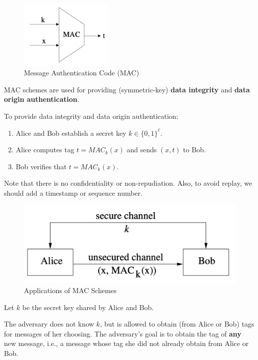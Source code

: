 \documentclass[12pt,titlepage]{article}
\begin{document}
\begin{center}
	\begin{figure}[h!]
		\centering
		\includegraphics[width=0.4\textwidth]{MAC.png}
		\caption{Message Authentication Code (MAC)}
	\end{figure}
\end{center}

MAC schemes are used for providing (symmetric-key) \textbf{data integrity} and \textbf{data origin authentication}.

To provide data integrity and data origin authentication:\begin{enumerate}
\item Alice and Bob establish a secret key $k \in \{0,1\}^\ell$.
\item Alice computes tag $t=MAC_k (x)$ and sends $(x, t)$ to Bob.
\item Bob verifies that $t = MAC_k (x)$.
\end{enumerate}

Note that there is no confidentiality or non-repudiation. Also, to avoid replay, we should add a timestamp or sequence number.

\begin{center}
	\begin{figure}[h!]
		\centering
		\includegraphics[width=\textwidth]{MAC_Application.png}
		\caption{Applications of MAC Schemes}
	\end{figure}
\end{center}

Let $k$ be the secret key shared by Alice and Bob.

The adversary does not know $k$, but is allowed to obtain (from Alice or Bob) tags for messages of her choosing. The adversary’s goal is to obtain the tag of \textbf{any} new message, i.e., a message whose tag she did not already obtain from Alice or Bob.
\end{document}
